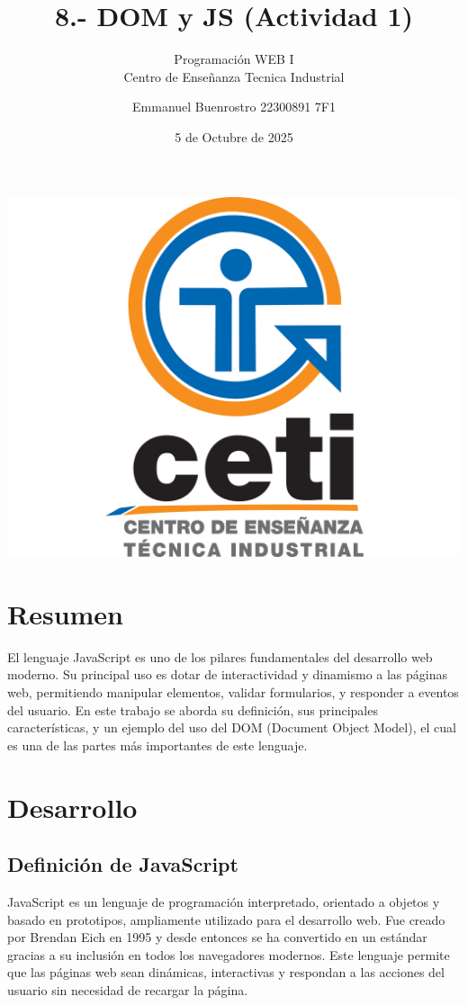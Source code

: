 \documentclass[11pt]{scrartcl}
\title {8.- DOM y JS (Actividad 1)}
\subtitle{Programación WEB I \\ Centro de Enseñanza Tecnica Industrial}
\date{5 de Octubre de 2025}
\author{Emmanuel Buenrostro 22300891 7F1}
\begin{document}
\maketitle


\begin{center}
   \includegraphics[scale=0.15]{../cetilogo.jpg} 
\end{center}
\newpage
\section{Resumen}
El lenguaje JavaScript es uno de los pilares fundamentales del desarrollo web moderno. Su principal uso es dotar de interactividad y dinamismo a las páginas web, permitiendo manipular elementos, validar formularios, y responder a eventos del usuario.  
En este trabajo se aborda su definición, sus principales características, y un ejemplo del uso del DOM (Document Object Model), el cual es una de las partes más importantes de este lenguaje.  

\section{Desarrollo}

\subsection*{Definición de JavaScript}
JavaScript es un lenguaje de programación interpretado, orientado a objetos y basado en prototipos, ampliamente utilizado para el desarrollo web. Fue creado por Brendan Eich en 1995 y desde entonces se ha convertido en un estándar gracias a su inclusión en todos los navegadores modernos.  
Este lenguaje permite que las páginas web sean dinámicas, interactivas y respondan a las acciones del usuario sin necesidad de recargar la página.
\end{document}
